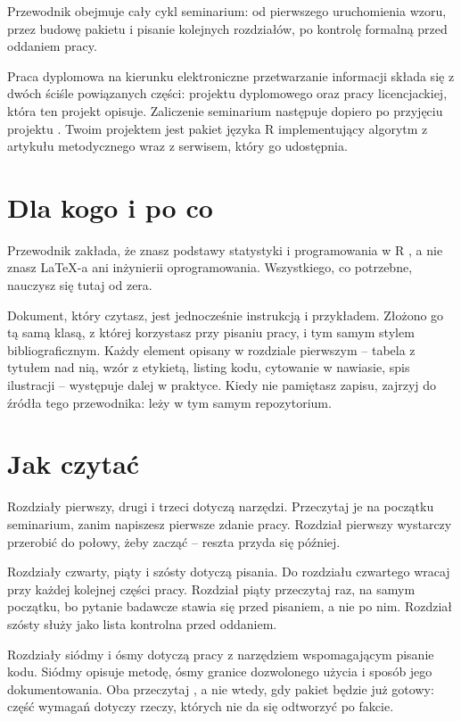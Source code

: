 \wprowadzenie

Przewodnik obejmuje cały cykl seminarium: od pierwszego uruchomienia wzoru, przez budowę pakietu i pisanie kolejnych rozdziałów, po kontrolę formalną przed oddaniem pracy.

Praca dyplomowa na kierunku elektroniczne przetwarzanie informacji składa się z dwóch ściśle powiązanych części: projektu dyplomowego oraz pracy licencjackiej, która ten projekt opisuje. Zaliczenie seminarium następuje dopiero po przyjęciu projektu \parencite{standardyEPI}. Twoim projektem jest pakiet języka R implementujący algorytm z artykułu metodycznego wraz z serwisem, który go udostępnia.

\section{Dla kogo i po co}

Przewodnik zakłada, że znasz podstawy statystyki i programowania w R \parencite{rcore}, a nie znasz LaTeX-a ani inżynierii oprogramowania. Wszystkiego, co potrzebne, nauczysz się tutaj od zera.

Dokument, który czytasz, jest jednocześnie instrukcją i przykładem. Złożono go tą samą klasą, z której korzystasz przy pisaniu pracy, i tym samym stylem bibliograficznym. Każdy element opisany w rozdziale pierwszym -- tabela z tytułem nad nią, wzór z etykietą, listing kodu, cytowanie w nawiasie, spis ilustracji -- występuje dalej w praktyce. Kiedy nie pamiętasz zapisu, zajrzyj do źródła tego przewodnika: leży w tym samym repozytorium.

\section{Jak czytać}

Rozdziały pierwszy, drugi i trzeci dotyczą narzędzi. Przeczytaj je na początku seminarium, zanim napiszesz pierwsze zdanie pracy. Rozdział pierwszy wystarczy przerobić do połowy, żeby zacząć -- reszta przyda się później.

Rozdziały czwarty, piąty i szósty dotyczą pisania. Do rozdziału czwartego wracaj przy każdej kolejnej części pracy. Rozdział piąty przeczytaj raz, na samym początku, bo pytanie badawcze stawia się przed pisaniem, a nie po nim. Rozdział szósty służy jako lista kontrolna przed oddaniem.

Rozdziały siódmy i ósmy dotyczą pracy z narzędziem wspomagającym pisanie kodu. Siódmy opisuje metodę, ósmy granice dozwolonego użycia i sposób jego dokumentowania. Oba przeczytaj , a nie wtedy, gdy pakiet będzie już gotowy: część wymagań dotyczy rzeczy, których nie da się odtworzyć po fakcie.

